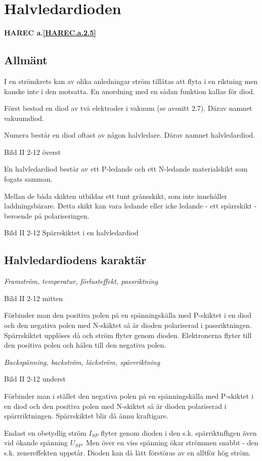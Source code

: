 \section{Halvledardioden}
\textbf{HAREC a.\ref{HAREC.a.2.5}\label{myHAREC.a.2.5}}

\subsection{Allmänt}
I en strömkrets kan av olika anledningar ström tillåtas att flyta i en riktning
men kanske inte i den motsatta. En anordning med en sådan funktion kallas för
diod.

Först bestod en diod av två elektroder i vakuum (se avsnitt 2.7). Därav namnet
vakuumdiod. %

Numera består en diod oftast av någon halvledare. Därav namnet halvledardiod.

Bild II 2-12 överst

En halvledardiod består av ett P-ledande och ett N-ledande materialskikt som
fogats samman.

Mellan de båda skikten utbildas ett tunt gränsskikt, som inte innehåller
laddningsbärare. Detta skikt kan vara ledande eller icke ledande - ett
spärrskikt - beroende på polariseringen.

Bild II 2-12 Spärrskiktet i en halvledardiod

\subsection{Halvledardiodens karaktär}

\emph{Framström, temperatur, förlusteffekt, passriktning}

Bild II 2-12 mitten

Förbinder man den positiva polen på en spänningskälla med P-skiktet i en diod
och den negativa polen med N-skiktet så är dioden polariserad i passriktningen.
Spärrskiktet upplöses då och ström flyter genom dioden. Elektronerna flyter till
den positiva polen och hålen till den negativa polen.

\emph{Backspänning, backström, läckström, spärrriktning}

Bild II 2-12 underst

Förbinder man i stället den negativa polen på en spänningskälla med P-skiktet i
en diod och den positiva polen med N-skiktet så är dioden polariserad i
spärrriktningen. Spärrskiktet blir då ännu kraftigare.

Endast en obetydlig ström \(I_{SP}\) flyter genom dioden i den s.k.
spärriktnfhgen även vid ökande spänning \(U_{SP}\). Men över en viss spänning
ökar strömmen snabbt - den s.k. zenereffekten uppstår. Dioden kan då lätt
förstöras av en alltför hög ström.

